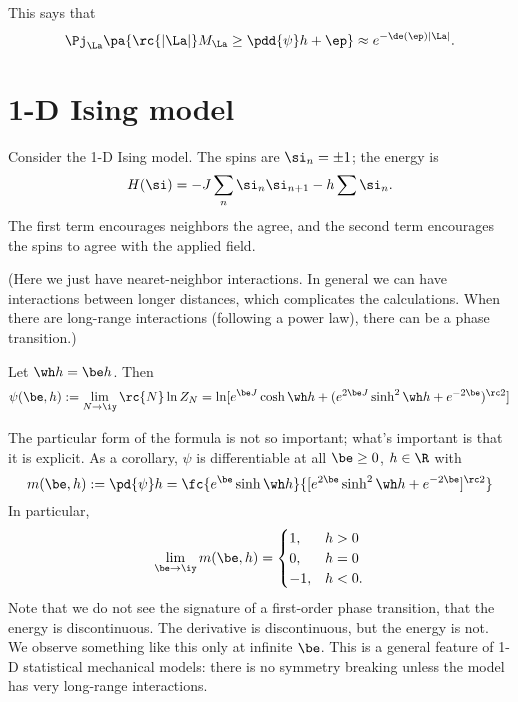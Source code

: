This says that
\[
\Pj_{\La} \pa{\rc{|\La|}M_{\La} \ge \pdd{\psi}h + \ep} \approx e^{-\de(\ep)|\La|}.
\]

\section{1-D Ising model}
Consider the 1-D Ising model. The spins are $\si_n=\pm 1$; the energy is
\[
H(\si) = -J\sum_{n} \si_n\si_{n+1} - h\sum \si_n.
\]
The first term encourages neighbors the agree, and the second term encourages the spins to agree with the applied field.

(Here we just have nearet-neighbor interactions. In general we can have interactions between longer distances, which complicates the calculations. When there are long-range interactions (following a power law), there can be a phase transition.)
\begin{thm}
Let $\wh h = \be h$. Then
\[
\psi(\be, h):= \lim_{N\to \iy} \rc{N} \ln Z_N = \ln [e^{\be J} \cosh \wh h + (e^{2\be J} \sinh^2 \wh h + e^{-2\be})^{\rc 2}]
\]
\end{thm}
The particular form of the formula is not so important; what's important is that it is explicit. As a corollary, $\psi$ is differentiable at all $\be \ge 0$, $h\in \R$ with 
\[
m(\be, h):=\pd{\psi}h =  \fc{e^{\be}\sinh \wh h}{[e^{2\be }\sinh^2 \wh h + e^{-2\be}]^{\rc 2}}
\]
In particular, 
\[
\lim_{\be\to \iy} m(\be, h) = \begin{cases}
1,&h>0\\
0,&h=0\\
-1,&h<0.
\end{cases}
\]
Note that we do not see the signature of a first-order phase transition, that the energy is discontinuous. The derivative is discontinuous, but the energy is not. We observe something like this only at infinite $\be$. This is a general feature of 1-D statistical mechanical models: there is no symmetry breaking unless the model has very long-range interactions.




